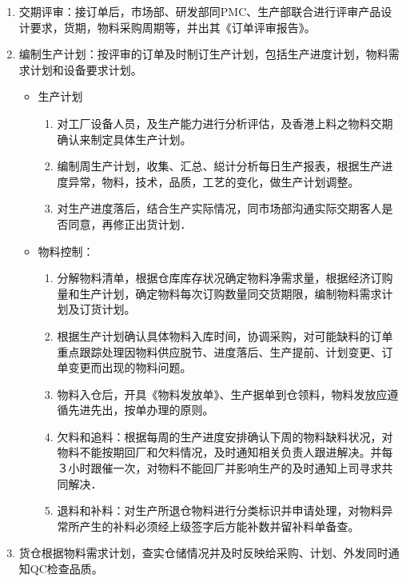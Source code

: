      \begin{enumerate}
        \item  交期评审：接订单后，市场部、研发部同PMC、生产部联合进行评审产品设计要求，货期，物料采购周期等，并出其《订单评审报告》。

        \item  编制生产计划：按评审的订单及时制订生产计划，包括生产进度计划，物料需求计划和设备要求计划。

            \begin{itemize}
                \item  生产计划
                    \begin{enumerate}
                        \item  对工厂设备人员，及生产能力进行分析评估，及香港上料之物料交期确认来制定具体生产计划。
                        \item  编制周生产计划，收集、汇总、縂计分析每日生产报表，根据生产进度异常，物料，技术，品质，工艺的变化，做生产计划调整。
                        \item  对生产进度落后，结合生产实际情况，同市场部沟通实际交期客人是否同意，再修正出货计划．
                    \end{enumerate}
                \item  物料控制：
                    \begin{enumerate}
                        \item  分解物料清单，根据仓库库存状况确定物料净需求量，根据经济订购量和生产计划，确定物料每次订购数量同交货期限，编制物料需求计划及订货计划。
                        \item  根据生产计划确认具体物料入库时间，协调采购，对可能缺料的订单重点跟踪处理因物料供应脱节、进度落后、生产提前、计划变更、订单变更而出现的物料问题。
                        \item  物料入仓后，开具《物料发放单》、生产据单到仓领料，物料发放应遵循先进先出，按单办理的原则。
                        \item  欠料和追料：根据每周的生产进度安排确认下周的物料缺料状况，对物料不能按期回厂和欠料情况，及时通知相关负责人跟进解决。并每３小时跟催一次，对物料不能回厂并影响生产的及时通知上司寻求共同解决．
                        \item  退料和补料：对生产所退仓物料进行分类标识并申请处理，对物料异常所产生的补料必须经上级签字后方能补数并留补料单备查。
                    \end{enumerate}
            \end{itemize}
        \item  货仓根据物料需求计划，查实仓储情况并及时反映给采购、计划、外发同时通知QC检查品质。

\end{enumerate}
